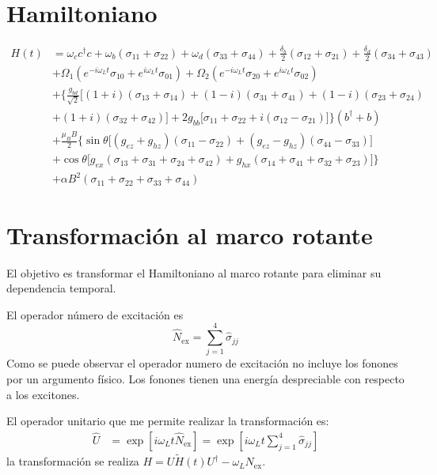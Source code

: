 \documentclass[../main.tex]{subfiles}
\begin{document}
\chapter{Hamiltoniano}
\begin{align}
	H(t) &= \omega_c c^\dagger c + \omega_b(\sigma_{11} + \sigma_{22}) + \omega_d(\sigma_{33} + \sigma_{44}) + \frac{\delta_b}{2}(\sigma_{12} + \sigma_{21}) + \frac{\delta_d}{2}(\sigma_{34} + \sigma_{43}) \nonumber \\
	&+ \Omega_1(e^{-i\omega_L t}\sigma_{10} + e^{i\omega_L t}\sigma_{01}) + \Omega_2(e^{-i\omega_L t}\sigma_{20} + e^{i\omega_L t}\sigma_{02}) \nonumber \\
	&+ \Big\{ \frac{g_{bd}}{\sqrt{2}} \big[(1+i)(\sigma_{13} + \sigma_{14}) + (1-i)(\sigma_{31} + \sigma_{41}) + (1-i)(\sigma_{23} + \sigma_{24})\nonumber \\
	&+ (1+i)(\sigma_{32} + \sigma_{42}) \big] + 2g_{bb} \big[\sigma_{11} + \sigma_{22} + i(\sigma_{12} - \sigma_{21}) \big] \Big\}(b^\dagger + b) \nonumber \\
	&+ \frac{\mu_B B}{2} \Big\{ \sin\theta \big[(g_{ez} + g_{hz})(\sigma_{11} - \sigma_{22}) + (g_{ez} - g_{hz})(\sigma_{44} - \sigma_{33}) \big] \nonumber \\
	&+ \cos\theta \big[ g_{ex}(\sigma_{13} + \sigma_{31} + \sigma_{24} + \sigma_{42}) + g_{hx}(\sigma_{14} + \sigma_{41} + \sigma_{32} + \sigma_{23}) \big] \Big\} \nonumber \\
	&+ \alpha B^2(\sigma_{11} + \sigma_{22} + \sigma_{33} + \sigma_{44})
\end{align}

\chapter{Transformación al marco rotante} \label{ap:marcoRotante}
El objetivo es transformar el Hamiltoniano al marco rotante para eliminar su dependencia temporal.

El operador número de excitación es
\begin{equation}
    \hat{N}_\text{ex}=\sum_{j=1}^4\hat{\sigma}_{jj}
\end{equation}
Como se puede observar el operador numero de excitación no incluye los fonones por un argumento físico. Los fonones tienen una energía despreciable con respecto a los excitones.

El operador unitario que me permite realizar la transformación es:
\begin{align}
    \hat{U} &= \exp[i\omega_Lt \hat{N}_\text{ex}] = \exp[i\omega_Lt \textstyle{\sum_{j=1}^4\hat{\sigma}_{jj}}]
\end{align}
la transformación se realiza $H = U \tilde{H}(t) U^\dagger - \omega_L N_\text{ex}$.
\end{document}
